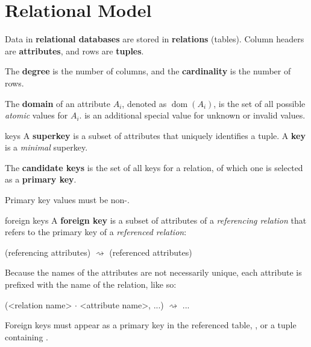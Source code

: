 \part{Relational Model}

Data in \textbf{relational databases} are stored in \textbf{relations} (tables).
Column headers are \textbf{attributes}, and rows are \textbf{tuples}.

The \textbf{degree} is the number of columns, and the \textbf{cardinality} is the number of rows.

The \textbf{domain} of an attribute $A_i$, denoted as $\operatorname*{dom}(A_i)$,
is the set of all possible \textit{atomic} values for $A_i$.
 is an additional special value for unknown or invalid values.


\begin{defn}{keys}
    A \textbf{superkey} is a subset of attributes that uniquely identifies a tuple.
    A \textbf{key} is a \textit{minimal} superkey.

    The \textbf{candidate keys} is the set of all keys for a relation, of which
    one is selected as a \textbf{primary key}.

    Primary key values must be non-.
\end{defn}

\begin{defn}{foreign keys}
    A \textbf{foreign key} is a subset of attributes of a \textit{referencing relation}
    that refers to the primary key of a \textit{referenced relation}:

    (referencing attributes) $\rightsquigarrow$ (referenced attributes)

    Because the names of the attributes are not necessarily unique,
    each attribute is prefixed with the name of the relation, like so:

    (<relation name> $\cdot$ <attribute name>, ...) $\rightsquigarrow$ ...

    Foreign keys must appear as a primary key in the referenced table,
    , or a tuple containing .
\end{defn}